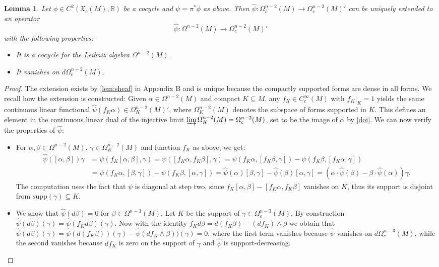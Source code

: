 \documentclass{article}
\newcommand{\R}{\mathbb{R}}
\newcommand{\supp}{\mathrm{supp}}
\newtheorem{Lemma}[Theorem]{Lemma}
\theoremstyle{definition}
\begin{document}
\begin{Lemma}\label{lemma:extendpsi}
Let $\phi\in C^2(\mathfrak X_c(M),\R)$ be a cocycle and $\psi=\pi^*\phi$ as above. Then $\widehat \psi\colon \Omega^{n-2}_c(M) \rightarrow \Omega^{n-2}_{c}(M)'$ can be uniquely extended to an operator
\begin{equation}\label{doi}
\widehat\psi \colon \Omega^{n-2}(M) \rightarrow \Omega^{n-2}_{c}(M)'
\end{equation}
with the following properties:
\begin{itemize}
    \item[(i)] It is a cocycle for the Leibniz algebra $\Omega^{n-2}(M)$.
    \item[(ii)] It vanishes on $d\Omega^{n-2}_c(M)$.
\end{itemize}
\end{Lemma}
\begin{proof}
The extension exists by \ref{lem:sheaf} in Appendix B and is unique because the compactly supported forms are dense in all forms. We recall how the extension is constructed: Given $\alpha \in  \Omega^{n-2}(M)$ and compact $K \subseteq M$, any $f_{K} \in C^{\infty}_{c}(M)$ with $f_K|_{K} = 1$ yields the same continuous linear functional 
$\widehat{\psi}(f_{K}\alpha) \in \Omega^{n-2}_{K}(M)'$, where $\Omega^{n-2}_{K}(M)$ denotes the subspace of forms supported in $K$. 
This defines an element  in the continuous linear dual of the injective limit $\varinjlim \Omega^{n-2}_{K}(M)=\Omega^{n-2}_{c}(M)$,
set to be the image of $\alpha$ by \eqref{doi}. We can now verify the properties of  $\widehat\psi$:

\begin{itemize}
\item [(i)] For $\alpha,\beta\in\Omega^{n-2}(M)$, $\gamma\in\Omega_K^{n-2}(M)$ and function $f_K$ as above, we get:
\begin{align*}
\widehat\psi([\alpha,\beta])\gamma&=\psi(f_K[\alpha,\beta],\gamma)=\psi([f_K\alpha,f_K\beta],\gamma)=\psi(f_K\alpha,[f_K\beta,\gamma])-\psi(f_K\beta,[f_K\alpha,\gamma])\\
&=\psi(f_K\alpha,[\beta,\gamma])-\psi(f_K\beta,[\alpha,\gamma])
=\widehat\psi(\alpha)[\beta,\gamma]-\widehat\psi(\beta)[\alpha,\gamma]=(\alpha\cdot\widehat\psi(\beta)-\beta\cdot\widehat\psi(\alpha))\gamma.
\end{align*}
The computation uses the fact that $\psi$ is diagonal at step two, since $f_K[\alpha,\beta]-[f_K\alpha,f_K\beta]$ vanishes on $K$,
thus its support is disjoint from $\supp(\gamma)\subseteq K$.
\item[(ii)] We show that $\widehat\psi(d\beta)=0$ for $\beta\in\Omega^{n-3}(M)$. Let $K$ be the support of $\gamma\in\Omega_c^{n-3}(M)$. 
By construction $\widehat\psi(d\beta)(\gamma)=\widehat\psi(f_Kd\beta)(\gamma)$.
Now with the identity $f_Kd\beta=d(f_K\beta)-(df_K)\wedge \beta$ we obtain that
$\widehat\psi(d\beta)(\gamma)=\widehat\psi(d(f_K\beta))(\gamma)- \widehat\psi(df_K\wedge \beta))(\gamma)=0$,
where the first term vanishes because $\widehat\psi$ vanishes on $d\Omega_c^{n-3}(M)$, while the second vanishes because $df_K$ is zero on the support of $\gamma$ and $\widehat\psi$ is support-decreasing.
\end{itemize}
\end{proof}
\end{document}
